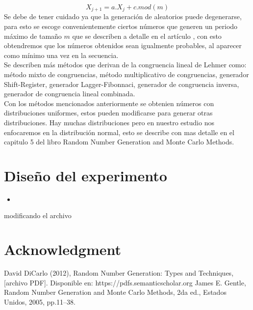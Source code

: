 \documentclass[conference]{IEEEtran}
\begin{document}
\begin{equation}
X_{j+1} = a.X_{j}+c.mod(m)
\end{equation}
Se debe de tener cuidado ya que la generaci\'on de aleatorios puede degenerarse, para esto se escoge convenientemente ciertos n\'umeros que generen un periodo m\'aximo de tama\~no $m$ que se describen a detalle en el art\'iculo \cite{b2}, con esto obtendremos que los n\'umeros obtenidos sean igualmente probables, al aparecer como m\'inimo una vez en la secuencia.\\
Se describen m\'as m\'etodos que derivan de la congruencia lineal de Lehmer como: m\'etodo mixto de congruencias, m\'etodo multiplicativo de congruencias, generador Shift-Register, generador Lagger-Fibonnaci, generador de congruencia inversa, generador de congruencia lineal combinada.\\
Con los m\'etodos mencionados anteriormente se obtenien n\'umeros con distribuciones uniformes, estos pueden modificarse para generar otras distribuciones. Hay muchas distribuciones pero en nuestro estudio nos enfocaremos en la distribuci\'on normal, esto se describe con mas detalle en el capitulo 5 del libro Random Number Generation and Monte Carlo Methods\cite{b3}. 
  
\section{Dise\~no del experimento}
\begin{itemize}

\item 
\end{itemize}

modificando el archivo

\section*{Acknowledgment}



\begin{thebibliography}{00}
 David DiCarlo (2012), Random Number Generation: Types and Techniques, [archivo PDF]. Disponible en: https://pdfs.semanticscholar.org
James E. Gentle, Random Number Generation and Monte Carlo Methods, 2da ed., Estados Unidos, 2005, pp.11--38.

\end{thebibliography}
\vspace{12pt}
\end{document}
